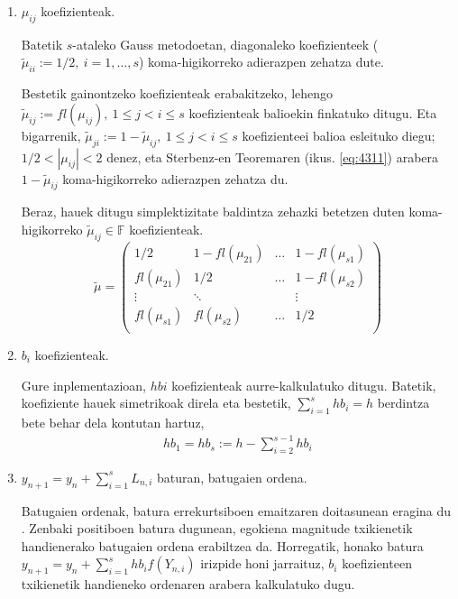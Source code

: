 \begin{enumerate}
\item $\mu_{ij}$ koefizienteak.

Batetik $s$-ataleko Gauss metodoetan, diagonaleko koefizienteek ($\tilde{\mu}_{ii}:=1/2, \ i=1,\dots,s$) koma-higikorreko adierazpen zehatza dute.

Bestetik gainontzeko koefizienteak erabakitzeko, lehengo $\tilde{\mu}_{ij}:=fl(\mu_{ij}), \ 1 \le j < i \le s$ koefizienteak balioekin finkatuko ditugu. Eta bigarrenik, $\tilde{\mu}_{ji}:=1-\tilde{\mu}_{ij} , \ 1 \le j < i \le s$ koefizienteei balioa esleituko diegu;  $1/2 < |\mu_{ij}| <2$ denez, eta Sterbenz-en Teoremaren (ikus. \ref{eq:4311}) arabera  $1-\tilde{\mu}_{ij}$ koma-higikorreko adierazpen zehatza du. 

Beraz, hauek ditugu simplektizitate baldintza zehazki betetzen duten koma-higikorreko $\tilde{\mu}_{ij}\in \mathbb{F}$ koefizienteak.   
\begin{equation}
\tilde{\mu}=\left(\begin{array}{cccc}
    1/2       & 1-fl(\mu_{21}) & \dots & 1-fl(\mu_{s1})      \\
    fl(\mu_{21})      & 1/2    & \dots & 1-fl(\mu_{s2})      \\
    \vdots            & \ddots         &       & \vdots      \\
    fl(\mu_{s1})      & fl(\mu_{s2})   & \dots & 1/2          \\ 
     \end{array}\right)
\end{equation}

\item $b_{i}$ koefizienteak.

Gure inplementazioan, $hbi$ koefizienteak aurre-kalkulatuko ditugu. Batetik, koefiziente hauek simetrikoak direla eta bestetik, $\sum\limits_{i=1}^{s} hb_i=h$ berdintza bete behar dela kontutan hartuz,
\begin{eqnarray}
hb_1=hb_s:= h - \sum\limits_{i=2}^{s-1} hb_i
\end{eqnarray}

\item $y_{n+1}=y_n+\sum\limits_{i=1}^{s}L_{n,i}$ baturan, batugaien ordena.

Batugaien ordenak, batura errekurtsiboen emaitzaren doitasunean eragina du \cite{Higham2002}. Zenbaki positiboen batura dugunean, egokiena magnitude txikienetik handienerako batugaien ordena erabiltzea da. Horregatik, honako batura $y_{n+1}=y_n+\sum\limits_{i=1}^{s} hb_i f(Y_{n,i})$ irizpide honi jarraituz, $b_i$ koefizienteen txikienetik handieneko ordenaren arabera kalkulatuko dugu. 

\end{enumerate}

